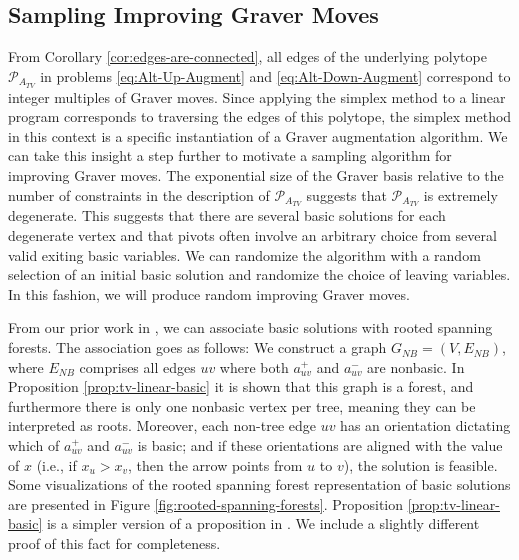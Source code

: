 \documentclass[pdflatex,sn-mathphys-num]{sn-jnl}%
\newcommand{\Z}{\mathbb{Z}} %
\DeclareMathOperator{\Vcal}{\mathcal{V}}
\DeclareMathOperator{\TV}{TV}
\begin{document}


\subsection{Sampling Improving Graver Moves}
From Corollary \ref{cor:edges-are-connected}, all edges of the underlying polytope $\mathcal{P}_{{A}_{TV}}$ in problems \eqref{eq:Alt-Up-Augment} and \eqref{eq:Alt-Down-Augment} correspond to integer multiples of Graver moves. Since applying the simplex method to a linear program corresponds to traversing the edges of this polytope, the simplex method in this context is a specific instantiation of a Graver augmentation algorithm. 
We can take this insight a step further to motivate a sampling algorithm for improving Graver moves. The exponential size of the Graver basis relative to the number of constraints in the description of $\mathcal{P}_{A_{TV}}$ suggests that $\mathcal{P}_{A_{TV}}$ is extremely degenerate. This suggests that there are several basic solutions for each degenerate vertex and that pivots often involve an arbitrary choice from several valid exiting basic variables. We can randomize the algorithm with a random selection of an initial basic solution and randomize the choice of leaving variables. In this fashion, we will produce random improving Graver moves.

From our prior work in \cite{yang2025specialized}, we can associate basic solutions with rooted spanning forests. The association goes as follows: We construct a graph $G_{NB} = (V, E_{NB})$, where $E_{NB}$ comprises all edges $uv$ where both $a_{uv}^+$ and $a_{uv}^-$ are nonbasic. In Proposition \ref{prop:tv-linear-basic} it is shown that this graph is a forest, and furthermore there is only one nonbasic vertex per tree, meaning they can be interpreted as roots. Moreover, each non-tree edge $uv$ has an orientation dictating which of $a_{uv}^+$ and $a_{uv}^-$ is basic; and if these orientations are aligned with the value of $x$ (i.e., if $x_u > x_v$, then the arrow points from $u$ to $v$), the solution is feasible. Some visualizations of the rooted spanning forest representation of basic solutions are presented in Figure \ref{fig:rooted-spanning-forests}. Proposition \ref{prop:tv-linear-basic} is a simpler version of a proposition in \cite{yang2025specialized}. We include a slightly different proof of this fact for completeness.
\end{document}
